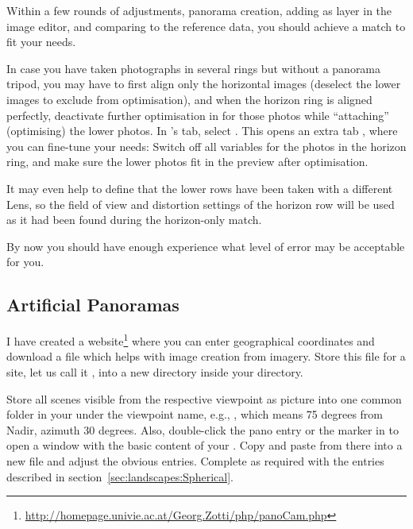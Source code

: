 Within a few rounds of adjustments, panorama creation, adding as layer
in the image editor, and comparing to the reference data, you should
achieve a match to fit your needs.

In case you have taken photographs in several rings but without a panorama tripod, you may have to
first align only the horizontal images (deselect the lower images to
exclude from optimisation), and when the horizon ring is aligned
perfectly, deactivate further optimisation in  for those photos
while ``attaching'' (optimising) the lower photos. In 's  tab,
select . This opens an
extra tab , where you can fine-tune your needs: Switch
off all variables for the photos in the horizon ring, and make sure
the lower photos fit in the preview after optimisation.

It may even help to define that the lower rows have been taken with a
different Lens, so the field of view and distortion settings of the
horizon row will be used as it had been found during the horizon-only
match.

By now you should have
enough experience what level of error may be acceptable for you.


\subsection{Artificial Panoramas}
\label{sec:landscapes:Artificial}

I have created a
website\footnote{\url{http://homepage.univie.ac.at/Georg.Zotti/php/panoCam.php}} where
you can enter geographical coordinates and download a file
  which helps with image creation from 
imagery. Store this file for a site, let us call it
, into a new directory  inside
your  directory.

Store all scenes visible from the respective viewpoint
 as picture into one common folder in your
 under the viewpoint name, e.g.,
, which means 75 degrees from Nadir, azimuth 30
degrees.  Also, double-click the pano entry or the marker in  to open a window with the
basic content of your . Copy and paste from there
into a new file  and adjust the obvious
entries. Complete as required with the entries described in
section~\ref{sec:landscapes:Spherical}.

